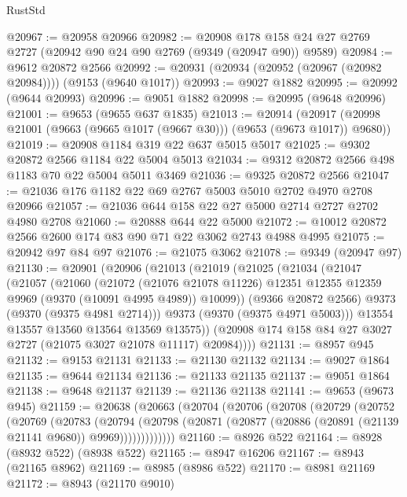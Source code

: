\begin{lexlean}{RustStd}
\begin{coremodule}
@20967 := @20958 @20966
@20982 := @20908 @178 @158 @24 @27 @2769 @2727 (@20942 @90 @24 @90 @2769 (@9349 (@20947 @90)) @9589)
@20984 := @9612 @20872 @2566
@20992 := @20931 (@20934 (@20952 (@20967 (@20982 @20984)))) (@9153 (@9640 @1017))
@20993 := @9027 @1882
@20995 := @20992 (@9644 @20993)
@20996 := @9051 @1882
@20998 := @20995 (@9648 @20996)
@21001 := @9653 (@9655 @637 @1835)
@21013 := @20914
    (@20917 (@20998 @21001 (@9663 (@9665 @1017 (@9667 @30))) (@9653 (@9673 @1017)) @9680))
@21019 := @20908 @1184 @319 @22 @637 @5015 @5017
@21025 := @9302 @20872 @2566 @1184 @22 @5004 @5013
@21034 := @9312 @20872 @2566 @498 @1183 @70 @22 @5004 @5011 @3469
@21036 := @9325 @20872 @2566
@21047 := @21036 @176 @1182 @22 @69 @2767 @5003 @5010 @2702 @4970 @2708 @20966
@21057 := @21036 @644 @158 @22 @27 @5000 @2714 @2727 @2702 @4980 @2708
@21060 := @20888 @644 @22 @5000
@21072 := @10012 @20872 @2566 @2600 @174 @83 @90 @71 @22 @3062 @2743 @4988 @4995
@21075 := @20942 @97 @84 @97
@21076 := @21075 @3062
@21078 := @9349 (@20947 @97)
@21130 := @20901
    (@20906
      (@21013
        (@21019
          (@21025
            (@21034
              (@21047
                (@21057
                  (@21060
                    (@21072
                      (@21076 @21078 @11226)
                      @12351
                      @12355
                      @12359
                      @9969
                      (@9370 (@10091 @4995 @4989))
                      @10099))
                  (@9366 @20872 @2566)
                  @9373
                  (@9370 (@9375 @4981 @2714)))
                @9373
                (@9370 (@9375 @4971 @5003)))
              @13554
              @13557
              @13560
              @13564
              @13569
              @13575))
          (@20908 @174 @158 @84 @27 @3027 @2727 (@21075 @3027 @21078 @11117) @20984))))
@21131 := @8957 @945
@21132 := @9153 @21131
@21133 := @21130 @21132
@21134 := @9027 @1864
@21135 := @9644 @21134
@21136 := @21133 @21135
@21137 := @9051 @1864
@21138 := @9648 @21137
@21139 := @21136 @21138
@21141 := @9653 (@9673 @945)
@21159 := @20638
    (@20663
      (@20704
        (@20706
          (@20708
            (@20729
              (@20752
                (@20769
                  (@20783
                    (@20794
                      (@20798
                        (@20871 (@20877 (@20886 (@20891 (@21139 @21141 @9680)) @9969)))))))))))))
@21160 := @8926 @522
@21164 := @8928 (@8932 @522) (@8938 @522)
@21165 := @8947 @16206
@21167 := @8943 (@21165 @8962)
@21169 := @8985 (@8986 @522)
@21170 := @8981 @21169
@21172 := @8943 (@21170 @9010)

\end{coremodule}
\end{lexlean}
